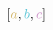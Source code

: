 \documentclass[preview]{standalone}
\begin{document}
$\left[\textcolor[HTML]{d4b76b}{a}, \textcolor[HTML]{58c4d5}{b}, \textcolor[HTML]{ce93ca}{c}\right]$
\end{document}
